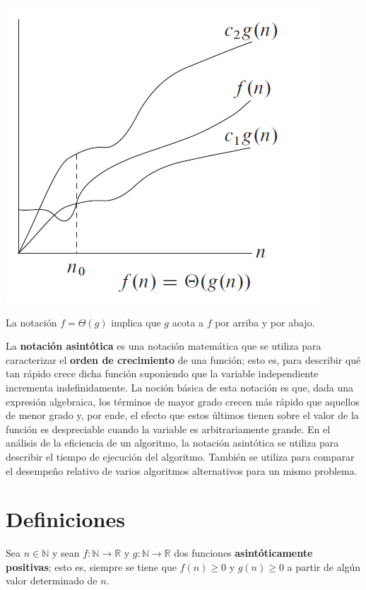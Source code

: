 \begin{marginfigure}
  \includegraphics[width=\linewidth]{figuras/big-theta}
  \caption{La notación \(f=\Theta(g)\) implica que \(g\) acota a \(f\) por arriba y por abajo.}
\end{marginfigure}

La \textbf{notación asintótica} es una notación matemática que se utiliza para caracterizar el \textbf{orden de crecimiento} de una función; esto es, para describir qué tan rápido crece dicha función suponiendo que la variable independiente incrementa indefinidamente.
La noción básica de esta notación es que, dada una expresión algebraica, los términos de mayor grado crecen más rápido que aquellos de menor grado y, por ende, el efecto que estos últimos tienen sobre el valor de la función es despreciable cuando la variable es arbitrariamente grande. 
En el análisis de la eficiencia de un algoritmo, la notación asintótica se utiliza para describir el tiempo de ejecución del algoritmo.
También se utiliza para comparar el desempeño relativo de varios algoritmos alternativos para un mismo problema.

\section{Definiciones}

Sea \(n\in\mathbb{N}\) y sean \(f:\mathbb{N}\to\mathbb{R}\) y \(g:\mathbb{N}\to\mathbb{R}\) dos funciones \textbf{asintóticamente positivas}; esto es, siempre se tiene que \(f(n)\geq 0\) y \(g(n)\geq 0\) a partir de algún valor determinado de \(n\). 

